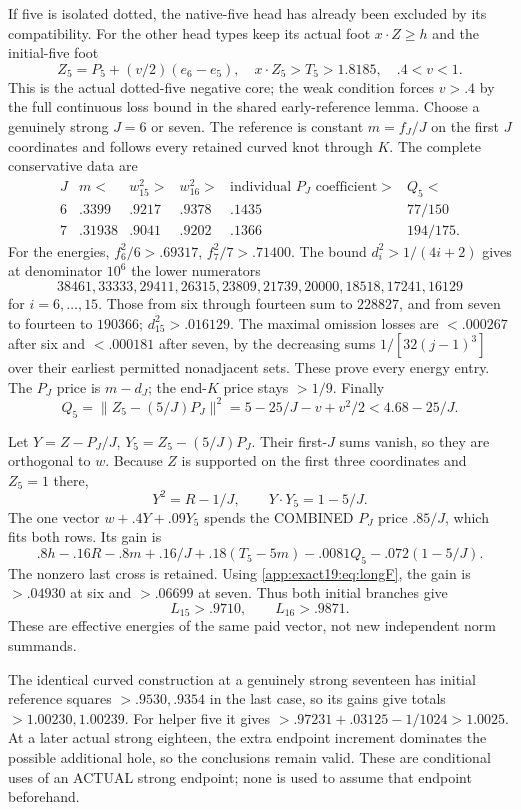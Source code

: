 If five is isolated dotted,
the native-five head has already
been excluded by its compatibility.
For the other head types keep its
actual foot \(x\cdot Z\ge h\)
and the initial-five foot
\[
 Z_5=P_5+(v/2)(e_6-e_5),\quad
                x\cdot Z_5>T_5>1.8185,\quad .4<v<1 .
\]
This is the actual dotted-five
negative core; the weak condition
forces \(v>.4\) by the full
continuous loss bound in the
shared early-reference lemma.
Choose a genuinely strong
\(J=6\) or seven.
The reference is constant
\(m=f_J/J\) on the first \(J\)
coordinates and follows every
retained curved knot through \(K\).
The complete conservative data are
\[
\begin{array}{c|c|c|c|c|c}
 J&m<&w_{15}^2>&w_{16}^2>&
 \text{individual }P_J\text{ coefficient}>&Q_5<\\ \hline
 6&.3399&.9217&.9378&.1435&77/150\\
 7&.31938&.9041&.9202&.1366&194/175 .
\end{array}
\]
For the energies, \(f_6^2/6>.69317\),
\(f_7^2/7>.71400\).
The bound \(d_i^2>1/(4i+2)\) gives
at denominator \(10^6\) the lower
numerators
\[
38461,33333,29411,26315,23809,21739,
20000,18518,17241,16129
\]
for \(i=6,\ldots,15\).
Those from six through fourteen sum to \(228827\),
and from seven to fourteen to
\(190366\); \(d_{15}^2>.016129\).
The maximal omission losses are
\(<.000267\) after six and
\(<.000181\) after seven, by the
decreasing sums \(1/[32(j-1)^3]\)
over their earliest permitted
nonadjacent sets.
These prove every energy entry.
The \(P_J\) price is \(m-d_J\);
the end-\(K\) price stays \(>1/9\).
Finally
\[
 Q_5=\|Z_5-(5/J)P_J\|^2
          =5-25/J-v+v^2/2<4.68-25/J .
\]

Let \(Y=Z-P_J/J\),
\(Y_5=Z_5-(5/J)P_J\).
Their first-\(J\) sums vanish,
so they are orthogonal to \(w\).
Because \(Z\) is supported on the
first three coordinates and
\(Z_5=1\) there,
\[
             Y^2=R-1/J,\qquad Y\cdot Y_5=1-5/J .
\]
The one vector \(w+.4Y+.09Y_5\)
spends the COMBINED
\(P_J\) price \(.85/J\), which
fits both rows.
Its gain is
\[
 .8h-.16R-.8m+.16/J
 +.18(T_5-5m)-.0081Q_5-.072(1-5/J).
\]
The nonzero last cross is retained.
Using \eqref{app:exact19:eq:longF},
the gain is \(>.04930\) at six
and \(>.06699\) at seven.
Thus both initial branches give
\[
                         L_{15}>.9710,\qquad L_{16}>.9871 .
\]
These are effective energies of
the same paid vector, not new
independent norm summands.

The identical curved construction
at a genuinely strong seventeen
has initial reference squares
\(>.9530,.9354\) in the last case,
so its gains give totals
\(>1.00230,1.00239\).
For helper five it gives
\(>.97231+.03125-1/1024>1.0025\).
At a later actual strong eighteen,
the extra endpoint increment
dominates the possible additional
hole, so the conclusions remain
valid.
These are conditional uses of
an ACTUAL strong endpoint;
none is used to assume that
endpoint beforehand.



